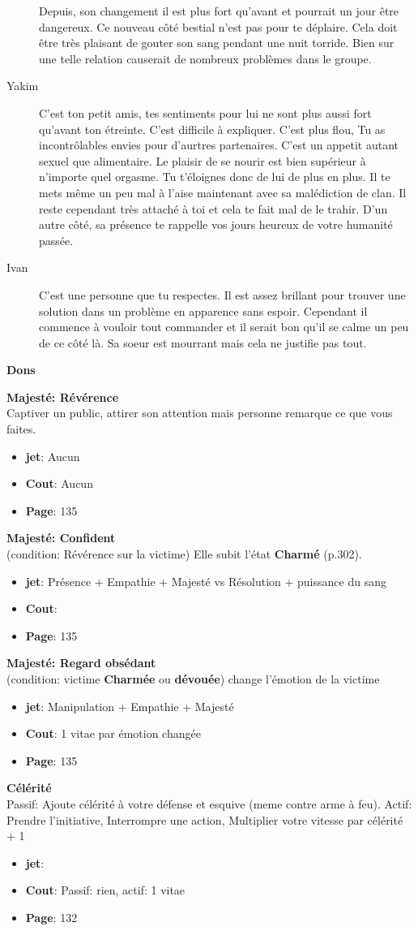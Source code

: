 \documentclass[oneside,12pt]{book}
\newcommand\don[5]{
\textbf{#1} \\
#2
\begin{itemize}
\item{ \textbf{jet}: #3}
\item{ \textbf{Cout}: #4}
\item{ \textbf{Page}: #5}
\end{itemize}
\vspace{0.5cm}
}
\begin{document}
\begin{flushleft}
\begin{description}
{Depuis, son changement il est plus fort qu'avant et pourrait un jour être dangereux. Ce nouveau côté bestial n'est pas pour te déplaire. Cela doit être très plaisant de gouter son sang pendant une nuit torride. Bien sur une telle relation causerait de nombreux problèmes dans le groupe.}
\item[Yakim]{C'est ton petit amis, tes sentiments pour lui ne sont plus aussi fort qu'avant ton étreinte. C'est difficile à expliquer. C'est plus flou, Tu as incontrôlables envies pour d'aurtres partenaires. C'est un appetit autant sexuel que alimentaire. Le plaisir de se nourir est bien supérieur à n'importe quel orgasme. Tu t'éloignes donc de lui de plus en plus. Il te mets même un peu mal à l'aise maintenant avec sa malédiction de clan. Il reste cependant très attaché à toi et cela te fait mal de le trahir. D'un autre côté, sa présence te rappelle vos jours heureux de votre humanité passée. }
\item[Ivan]{C'est une personne que tu respectes. Il est assez brillant pour trouver une solution dans un problème en apparence sans espoir. Cependant il commence à vouloir tout commander et il serait bon qu'il se calme un peu de ce côté là. Sa soeur est mourrant mais cela ne justifie pas tout.}
\end{description}
 
\clearpage
\textbf{\large Dons}
\vspace{0.5cm}

\don{Majesté: Révérence}{Captiver un public, attirer son attention mais personne remarque ce que vous faites.}{Aucun}{Aucun}{135}
\don{Majesté: Confident}{(condition: Révérence sur la victime) Elle subit l’état \textbf{Charmé} (p.302).}{Présence + Empathie + Majesté vs Résolution + puissance du sang}{}{135}
\don{Majesté: Regard obsédant}{(condition: victime \textbf{Charmée} ou \textbf{dévouée}) change l’émotion de la victime}{Manipulation + Empathie + Majesté}{1 vitae par émotion changée}{135}
\don{Célérité}{Passif: Ajoute célérité à votre défense et esquive (meme contre arme à feu). Actif: Prendre l’initiative, Interrompre une action, Multiplier votre vitesse par célérité + 1}{}{Passif: rien, actif: 1 vitae }{132}


\clearpage

\end{flushleft}
\end{document}
